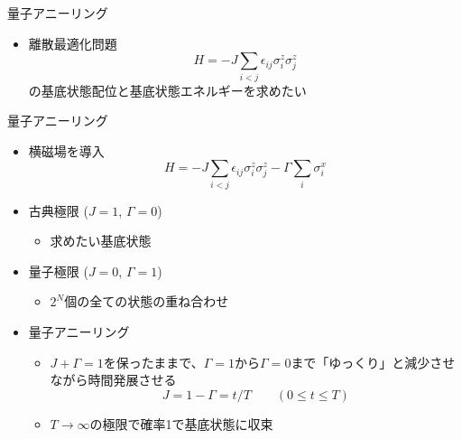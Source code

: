 \begin{frame}[t,fragile]{量子アニーリング}
  \begin{itemize}
  \item 離散最適化問題
    \[
    H = -J \sum_{i<j} \epsilon_{ij} \sigma_i^z \sigma_j^z
    \]
    の基底状態配位と基底状態エネルギーを求めたい
    \begin{center}
    \end{center}
  \end{itemize}
\end{frame}

\begin{frame}[t,fragile]{量子アニーリング}
  \begin{itemize}
  \item 横磁場を導入
    \[
    H = -J \sum_{i<j} \epsilon_{ij} \sigma_i^z \sigma_j^z - \Gamma \sum_i \sigma_i^x
    \]
  \item 古典極限 ($J=1$, $\Gamma=0$)
    \begin{itemize}
    \item 求めたい基底状態
    \end{itemize}
  \item 量子極限 ($J=0$, $\Gamma=1$)
    \begin{itemize}
    \item $2^N$個の全ての状態の重ね合わせ
    \end{itemize}
  \item 量子アニーリング
    \begin{itemize}
    \item $J+\Gamma=1$を保ったままで、$\Gamma=1$から$\Gamma=0$まで「ゆっくり」と減少させながら時間発展させる
      \[
      J = 1-\Gamma = t/T \qquad (0 \le t \le T)
      \]
    \item $T \rightarrow \infty$の極限で確率1で基底状態に収束
    \end{itemize}
  \end{itemize}
\end{frame}

